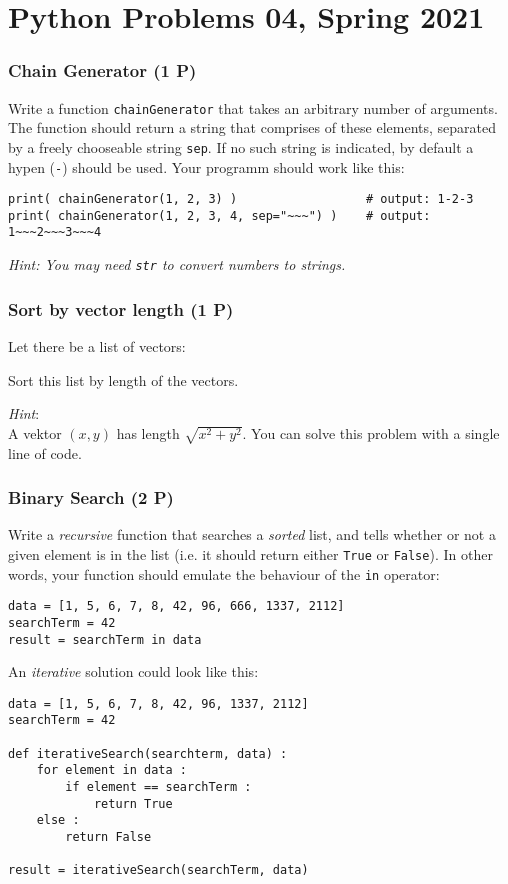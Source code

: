 \documentclass[
	ngerman,
	fontsize=10pt,
	parskip=half,
	titlepage=true,
	DIV=12
]{scrartcl}
\newcommand*{\inPy}[1]{\texttt{#1}}
\newcommand*{\ie}{i.\;e. }
\begin{document}
\part*{Python Problems 04, Spring 2021}

\section{Chain Generator (1 P)}
Write a function  \texttt{chainGenerator} that takes an arbitrary number of arguments. The function should return a string that comprises of these elements, separated by a freely chooseable string \texttt{sep}. If no such string is indicated, by default a hypen (\texttt{-}) should be used. Your programm should work like this:
\begin{verbatim}
print( chainGenerator(1, 2, 3) )                  # output: 1-2-3
print( chainGenerator(1, 2, 3, 4, sep="~~~") )    # output: 1~~~2~~~3~~~4
\end{verbatim}

\emph{Hint: You may need \inPy{str} to convert numbers to strings.}


\section{Sort by vector length (1 P)}
Let there be a list of vectors:

Sort this list by length of the vectors.

\emph{Hint}:\\
A vektor $(x, y)$ has length $\sqrt{x^2 + y^2}$. You can solve this problem with a single line of code.


\section{Binary Search (2 P)}
Write a \emph{recursive} function that searches a \emph{sorted} list, and tells whether or not a given element is in the list (\ie it should return either \inPy{True} or \inPy{False}). In other words, your function should emulate the behaviour of the \inPy{in} operator:
\begin{verbatim}
data = [1, 5, 6, 7, 8, 42, 96, 666, 1337, 2112]
searchTerm = 42
result = searchTerm in data
\end{verbatim}

An \emph{iterative} solution could look like this:
\begin{verbatim}
data = [1, 5, 6, 7, 8, 42, 96, 1337, 2112]
searchTerm = 42

def iterativeSearch(searchterm, data) :
    for element in data :
        if element == searchTerm :
            return True
    else :
        return False

result = iterativeSearch(searchTerm, data)
\end{verbatim}
\end{document}
